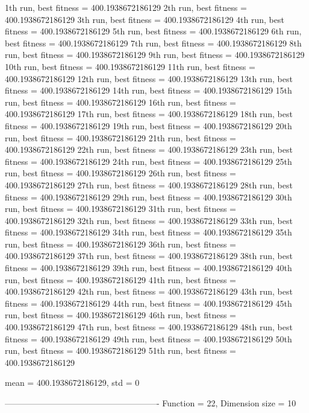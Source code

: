 1th run, best fitness = 400.1938672186129
2th run, best fitness = 400.1938672186129
3th run, best fitness = 400.1938672186129
4th run, best fitness = 400.1938672186129
5th run, best fitness = 400.1938672186129
6th run, best fitness = 400.1938672186129
7th run, best fitness = 400.1938672186129
8th run, best fitness = 400.1938672186129
9th run, best fitness = 400.1938672186129
10th run, best fitness = 400.1938672186129
11th run, best fitness = 400.1938672186129
12th run, best fitness = 400.1938672186129
13th run, best fitness = 400.1938672186129
14th run, best fitness = 400.1938672186129
15th run, best fitness = 400.1938672186129
16th run, best fitness = 400.1938672186129
17th run, best fitness = 400.1938672186129
18th run, best fitness = 400.1938672186129
19th run, best fitness = 400.1938672186129
20th run, best fitness = 400.1938672186129
21th run, best fitness = 400.1938672186129
22th run, best fitness = 400.1938672186129
23th run, best fitness = 400.1938672186129
24th run, best fitness = 400.1938672186129
25th run, best fitness = 400.1938672186129
26th run, best fitness = 400.1938672186129
27th run, best fitness = 400.1938672186129
28th run, best fitness = 400.1938672186129
29th run, best fitness = 400.1938672186129
30th run, best fitness = 400.1938672186129
31th run, best fitness = 400.1938672186129
32th run, best fitness = 400.1938672186129
33th run, best fitness = 400.1938672186129
34th run, best fitness = 400.1938672186129
35th run, best fitness = 400.1938672186129
36th run, best fitness = 400.1938672186129
37th run, best fitness = 400.1938672186129
38th run, best fitness = 400.1938672186129
39th run, best fitness = 400.1938672186129
40th run, best fitness = 400.1938672186129
41th run, best fitness = 400.1938672186129
42th run, best fitness = 400.1938672186129
43th run, best fitness = 400.1938672186129
44th run, best fitness = 400.1938672186129
45th run, best fitness = 400.1938672186129
46th run, best fitness = 400.1938672186129
47th run, best fitness = 400.1938672186129
48th run, best fitness = 400.1938672186129
49th run, best fitness = 400.1938672186129
50th run, best fitness = 400.1938672186129
51th run, best fitness = 400.1938672186129

mean = 400.1938672186129, std = 0

-------------------------------------------------------
Function = 22, Dimension size = 10

